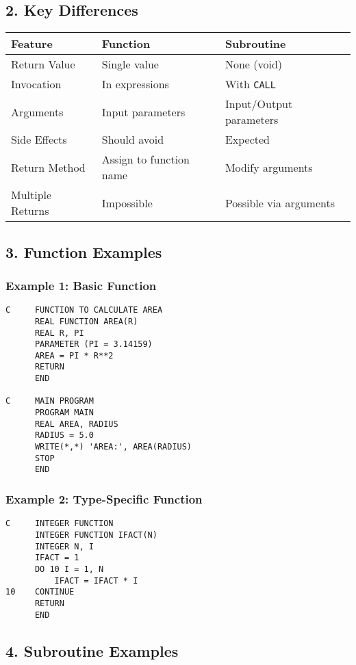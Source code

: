 \documentclass{book}
\begin{document}
\subsection*{2. Key Differences}
\begin{center}
\begin{tabular}{|l|l|l|}
\hline
\textbf{Feature} & \textbf{Function} & \textbf{Subroutine} \\ 
\hline
Return Value & Single value & None (void) \\
Invocation & In expressions & With \texttt{CALL} \\
Arguments & Input parameters & Input/Output parameters \\
Side Effects & Should avoid & Expected \\
Return Method & Assign to function name & Modify arguments \\
Multiple Returns & Impossible & Possible via arguments \\
\hline
\end{tabular}
\end{center}

\subsection*{3. Function Examples}
\subsubsection*{Example 1: Basic Function}
\begin{verbatim}
C     FUNCTION TO CALCULATE AREA
      REAL FUNCTION AREA(R)
      REAL R, PI
      PARAMETER (PI = 3.14159)
      AREA = PI * R**2
      RETURN
      END

C     MAIN PROGRAM
      PROGRAM MAIN
      REAL AREA, RADIUS
      RADIUS = 5.0
      WRITE(*,*) 'AREA:', AREA(RADIUS)
      STOP
      END
\end{verbatim}

\subsubsection*{Example 2: Type-Specific Function}
\begin{verbatim}
C     INTEGER FUNCTION
      INTEGER FUNCTION IFACT(N)
      INTEGER N, I
      IFACT = 1
      DO 10 I = 1, N
          IFACT = IFACT * I
10    CONTINUE
      RETURN
      END
\end{verbatim}

\subsection*{4. Subroutine Examples}
\end{document}
